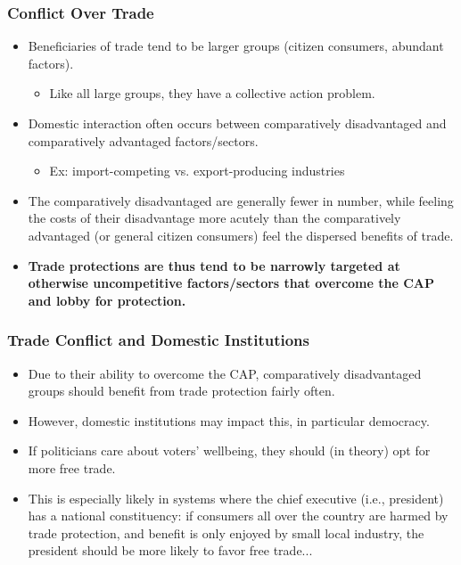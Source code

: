 \documentclass{beamer}
\begin{document}
\begin{frame} 
	\frametitle{\LARGE Conflict Over Trade}
	\begin{itemize}
			\item Beneficiaries of trade tend to be larger groups (citizen consumers, abundant factors). \pause 
			\begin{itemize}
				\item Like all large groups, they have a collective action problem.
			\end{itemize}
			\item Domestic interaction often occurs between comparatively disadvantaged and comparatively advantaged factors/sectors. 
			\begin{itemize}
				\item Ex: import-competing vs. export-producing industries \pause 
			\end{itemize}
			\item The comparatively disadvantaged are generally fewer in number, while feeling the costs of their disadvantage more acutely than the comparatively advantaged (or general citizen consumers) feel the dispersed benefits of trade.  \pause 
			\item \textbf{Trade protections are thus tend to be narrowly targeted at otherwise uncompetitive factors/sectors that overcome the CAP and lobby for protection.}  
	\end{itemize}
\end{frame}

\begin{frame} 
	\frametitle{\LARGE Trade Conflict and Domestic Institutions}
	\begin{itemize}
		\item Due to their ability to overcome the CAP, comparatively disadvantaged groups should benefit from trade protection fairly often. \pause
		\item However, domestic institutions may impact this, in particular democracy. \pause
		\item If politicians care about voters' wellbeing, they should (in theory) opt for more free trade.
		\item This is especially likely in systems where the chief executive (i.e., president) has a national constituency: if consumers all over the country are harmed by trade protection, and benefit is only enjoyed by small local industry, the president should be more likely to favor free trade...
	\end{itemize}
\end{frame}
\end{document}
